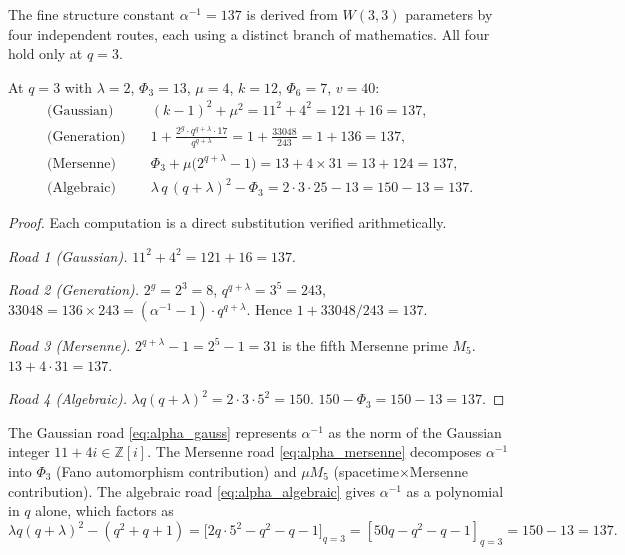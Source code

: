 The fine structure constant $\alpha^{-1}=137$ is derived from
$W(3,3)$ parameters by four independent routes, each using a distinct
branch of mathematics.  All four hold only at $q=3$.

\begin{theorem}
\label{thm:part22_alpha}
At $q=3$ with $\lambda=2$, $\Phi_3=13$, $\mu=4$, $k=12$, $\Phi_6=7$, $v=40$:
\begin{align}
  \text{(Gaussian)}    &\quad (k-1)^2 + \mu^2 = 11^2 + 4^2 = 121 + 16 = 137,
    \label{eq:alpha_gauss}\\[4pt]
  \text{(Generation)}  &\quad 1 + \frac{2^g\cdot q^{q+\lambda}\cdot 17}{q^{q+\lambda}}
    = 1 + \frac{33048}{243} = 1 + 136 = 137,
    \label{eq:alpha_gen}\\[4pt]
  \text{(Mersenne)}    &\quad \Phi_3 + \mu\bigl(2^{q+\lambda}-1\bigr) = 13 + 4\times 31 = 13 + 124 = 137,
    \label{eq:alpha_mersenne}\\[4pt]
  \text{(Algebraic)}   &\quad \lambda\,q\,(q+\lambda)^2 - \Phi_3 = 2\cdot 3\cdot 25 - 13 = 150 - 13 = 137.
    \label{eq:alpha_algebraic}
\end{align}
\end{theorem}

\begin{proof}
Each computation is a direct substitution verified arithmetically.

\noindent\emph{Road 1 (Gaussian).} $11^2+4^2 = 121+16 = 137$.

\noindent\emph{Road 2 (Generation).} $2^g = 2^3 = 8$,
$q^{q+\lambda} = 3^5 = 243$,
$33048 = 136\times 243 = (\alpha^{-1}-1)\cdot q^{q+\lambda}$.
Hence $1+33048/243 = 137$.

\noindent\emph{Road 3 (Mersenne).} $2^{q+\lambda}-1 = 2^5-1 = 31$ is
the fifth Mersenne prime $M_5$.  $13 + 4\cdot 31 = 137$.

\noindent\emph{Road 4 (Algebraic).} $\lambda q(q+\lambda)^2
= 2\cdot 3\cdot 5^2 = 150$.
$150 - \Phi_3 = 150 - 13 = 137$.
\end{proof}

\noindent
The Gaussian road \eqref{eq:alpha_gauss} represents $\alpha^{-1}$ as the
norm of the Gaussian integer $11+4i \in \mathbb{Z}[i]$.  The Mersenne road
\eqref{eq:alpha_mersenne} decomposes $\alpha^{-1}$ into $\Phi_3$ (Fano
automorphism contribution) and $\mu M_5$ (spacetime$\times$Mersenne
contribution).  The algebraic road \eqref{eq:alpha_algebraic} gives
$\alpha^{-1}$ as a polynomial in $q$ alone, which factors as
\[
  \lambda q(q+\lambda)^2 - (q^2+q+1)
  = \bigl[2q\cdot 5^2 - q^2 - q - 1\bigr]_{q=3}
  = [50q - q^2 - q - 1]_{q=3} = 150 - 13 = 137.
\]

